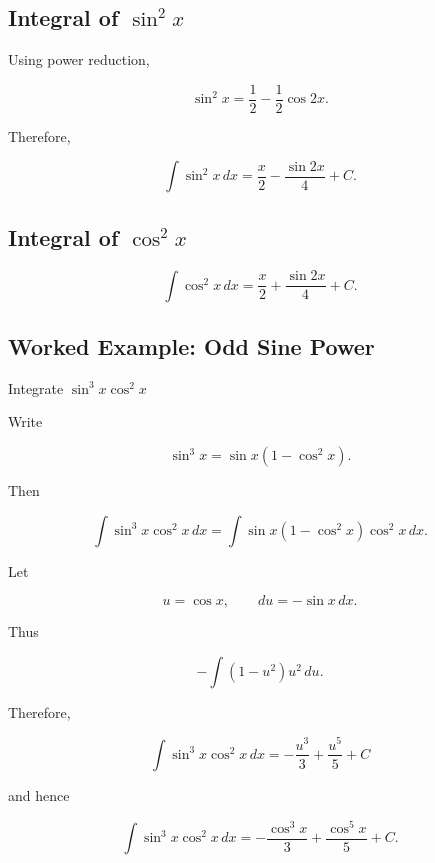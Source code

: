 \subsection{Integral of \(\sin^2x\)}
\label{subsec:integral-sine-squared}

Using power reduction,

\[
\sin^2x
=
\frac12
-
\frac12\cos2x.
\]

Therefore,

\[
\boxed{
\int\sin^2x\,dx
=
\frac{x}{2}
-
\frac{\sin2x}{4}
+
C.
}
\]

\subsection{Integral of \(\cos^2x\)}
\label{subsec:integral-cosine-squared}

\[
\boxed{
\int\cos^2x\,dx
=
\frac{x}{2}
+
\frac{\sin2x}{4}
+
C.
}
\]

\subsection{Worked Example: Odd Sine Power}
\label{subsec:worked-odd-sine-power}

\begin{workedexamplebox}{Integrate \(\sin^3x\cos^2x\)}

Write

\[
\sin^3x
=
\sin x(1-\cos^2x).
\]

Then

\[
\int
\sin^3x\cos^2x
\,dx
=
\int
\sin x
(1-\cos^2x)
\cos^2x
\,dx.
\]

Let

\[
u=\cos x,
\qquad
du=-\sin x\,dx.
\]

Thus

\[
-\int
(1-u^2)u^2
\,du.
\]

Therefore,

\begin{answerbox}
\[
\boxed{
\int
\sin^3x\cos^2x
\,dx
=
-\frac{u^3}{3}
+
\frac{u^5}{5}
+
C
}
\]

and hence

\[
\boxed{
\int
\sin^3x\cos^2x
\,dx
=
-\frac{\cos^3x}{3}
+
\frac{\cos^5x}{5}
+
C.
}
\]
\end{answerbox}

\end{workedexamplebox}

